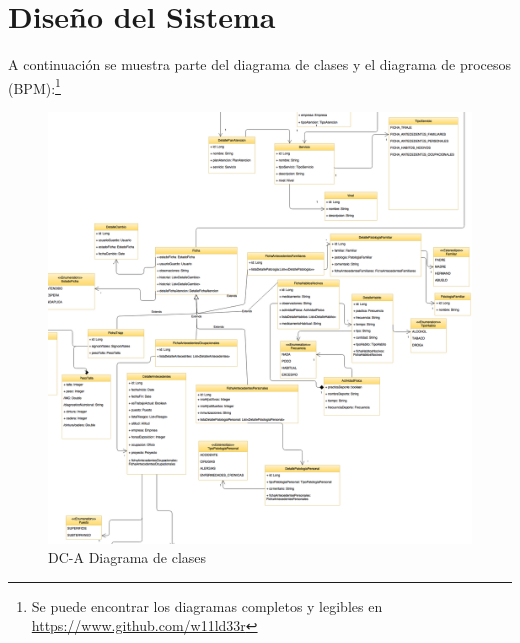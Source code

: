 	\newpage
	\section{Diseño del Sistema}
		A continuación se muestra parte del diagrama de clases y el diagrama de
		procesos (BPM):\footnote{Se puede encontrar los diagramas completos y legibles
		en \href{https://www.github.com/w11ld33r}{https://www.github.com/w11ld33r}}

		\begin{figure}[H]
		    \centering
			\includegraphics[width=17cm]{../imgs/disenio/DC2.png}
			\caption{DC-A Diagrama de clases}
		\end{figure}

